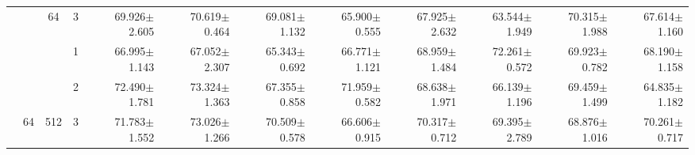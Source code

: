 \begin{table}[htpb]
{\begin{tabular}{c|c|c|c|rr|rr|rr|rr}
                                 &                                                                                 & \multirow{-3}{*}{64}                                                                   & 3                                                                                         & 69.926$\pm$2.605                        & 70.619$\pm$0.464                        & 69.081$\pm$1.132                        & 65.900$\pm$0.555                        & 67.925$\pm$2.632                        & 63.544$\pm$1.949                        & 70.315$\pm$1.988                        & 67.614$\pm$1.160                       \\ \cline{3-12} 
                                 &                                                                                 &                                                                                        & 1                                                                                         & 66.995$\pm$1.143                        & 67.052$\pm$2.307                        & 65.343$\pm$0.692                        & 66.771$\pm$1.121                        & 68.959$\pm$1.484                        & 72.261$\pm$0.572                        & 69.923$\pm$0.782                        & 68.190$\pm$1.158                       \\
                                 &                                                                                 &                                                                                        & 2                                                                                         & 72.490$\pm$1.781                        & 73.324$\pm$1.363                        & 67.355$\pm$0.858                        & 71.959$\pm$0.582                        & 68.638$\pm$1.971                        & 66.139$\pm$1.196                        & 69.459$\pm$1.499                        & 64.835$\pm$1.182                       \\
                                 & \multirow{-6}{*}{64}                                                            & \multirow{-3}{*}{512}                                                                  & 3                                                                                         & 71.783$\pm$1.552                        & 73.026$\pm$1.266                        & 70.509$\pm$0.578                        & 66.606$\pm$0.915                        & 70.317$\pm$0.712                        & 69.395$\pm$2.789                        & 68.876$\pm$1.016                        & 70.261$\pm$0.717                       \\ \cline{2-12} 

\end{tabular}}
\end{table}

